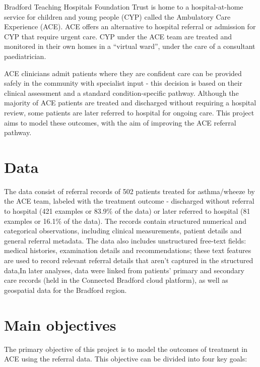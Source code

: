 Bradford Teaching Hospitals Foundation Trust is home to a hospital-at-home service for children and young people (CYP) called the Ambulatory Care Experience (ACE).
ACE offers an alternative to hospital referral or admission for CYP that require urgent care. CYP under the ACE team are treated and monitored in their own homes in a ``virtual ward'', under the care of a consultant paediatrician.

ACE clinicians admit patients where they are confident care can be provided safely in the community with specialist input - this decision is based on their clinical assessment and a standard condition-specific pathway.
Although the majority of ACE patients are treated and discharged without requiring a hospital review, some patients are later referred to hospital for ongoing care.
This project aims to model these outcomes, with the aim of improving the ACE referral pathway.

\section*{Data}\label{sec:data}

The data consist of referral records of 502 patients treated for asthma/wheeze by the ACE team, labeled with the treatment outcome - discharged without referral to hospital (421 examples or 83.9\% of the data) or later referred to hospital (81 examples or 16.1\% of the data).
The records contain structured numerical and categorical observations, including clinical measurements, patient details and general referral metadata.
The data also includes unstructured free-text fields: medical histories, examination details and recommendations;
these text features are used to record relevant referral details that aren't captured in the structured
data,In later analyses, data were linked from patients' primary and secondary care records (held in the Connected Bradford cloud platform), as well as geospatial data for the Bradford region.

\section*{Main objectives}\label{sec:main-objectives}

The primary objective of this project is to model the outcomes of treatment in ACE using the referral data.
This objective can be divided into four key goals:

